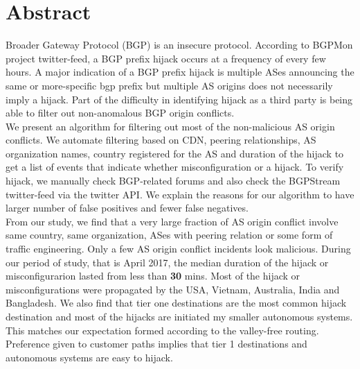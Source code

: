  \section{Abstract}\label{sec:abstract}
Broader Gateway Protocol (BGP) is an insecure protocol. According to BGPMon project twitter-feed, a BGP prefix hijack occurs at a frequency of every few hours. A major indication of a BGP prefix hijack is multiple ASes announcing the same or more-specific bgp prefix but multiple AS origins does not necessarily imply a hijack. Part of the difficulty in identifying hijack as a third party is being able to filter out non-anomalous BGP origin conflicts.\\
We present an algorithm for filtering out most of the non-malicious AS origin conflicts. We automate filtering based on CDN, peering relationships, AS organization names, country registered for the AS and duration of the hijack to get a list of events that indicate whether misconfiguration or a hijack. To verify hijack, we manually check BGP-related forums and also check the BGPStream twitter-feed via the twitter API. We explain the reasons for our algorithm to have larger number of false positives and fewer false negatives. \\
From our study, we find that a very large fraction of AS origin conflict involve same country, same organization, ASes with peering relation or some form of traffic engineering. Only a few AS origin conflict incidents look malicious. During our period of study, that is April 2017, the median duration of the hijack or misconfigurarion lasted from less than \textbf{30 }mins. Most of the hijack or misconfigurations were propagated by the USA, Vietnam, Australia, India and Bangladesh. We also find that tier one destinations are the most common hijack destination and most of the hijacks are initiated my smaller autonomous systems. This matches our expectation formed according to the valley-free routing. Preference given to customer paths implies that tier 1 destinations and autonomous systems are easy to hijack.
